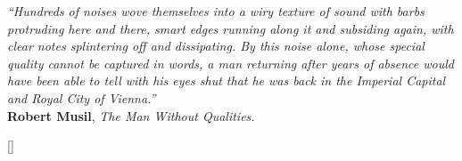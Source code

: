 \documentclass[final,twoside,11pt]{book}
\makeatletter
\numberwithin{equation}{section}
\numberwithin{figure}{chapter}
\numberwithin{table}{chapter}
\def\cleardoublepage{\clearpage\if@twoside \ifodd\c@page\else
  \hbox{}
  \thispagestyle{empty}
  \newpage
  \if@twocolumn\hbox{}\newpage\fi\fi\fi}
\makeatother
\begin{document}
\cleardoublepage

\null\vspace{2cm}
\begin{flushright}
\begin{minipage}[t]{0.75\textwidth}
{\itshape``Hundreds of noises wove themselves into a wiry texture of sound with barbs protruding here and there, smart edges running along it and subsiding again, with clear notes splintering off and dissipating. By this noise alone, whose special quality cannot be captured in words, a man returning after years of absence would have been able to tell with his eyes shut that he was back in the Imperial Capital and Royal City of Vienna.''}\\[-0mm]

{\cabincondensed\small\hfill \textbf{Robert Musil}, \emph{The Man Without Qualities.}}
\end{minipage}
\end{flushright}
\cleardoublepage

\renewcommand{\cftdotsep}{2}
\tableofcontents
\cleardoublepage

\begingroup
\setlength{\cftbeforefigskip}{1mm}
\setlength{\cftbeforetabskip}{1mm}
\renewcommand{\cftfigfont}{\small}
\renewcommand{\cfttabfont}{\small}
\renewcommand*{\addvspace}[1]{}
\listoffigures
\cleardoublepage

\listoftables
\cleardoublepage
\endgroup



\cleardoublepage


\mainmatter


[\vspace{-1mm}]
\end{document}
